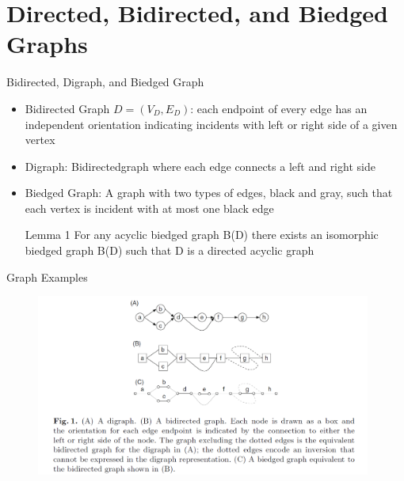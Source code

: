 \documentclass{beamer}
\begin{document}
\section{Directed, Bidirected, and Biedged Graphs}
\begin{frame}{Bidirected, Digraph, and Biedged Graph}
\begin{itemize}
    \item  Bidirected Graph $D= (V_D,E_D)$: each endpoint of every edge has an independent orientation indicating incidents with left or right side of a given vertex
    \item Digraph: Bidirectedgraph where each edge connects a left and right side
    \item Biedged Graph: A graph with two types of edges, black and gray, such that each vertex is incident with at most one black edge
    \begin{block}{Lemma 1}
    For any acyclic biedged graph B(D) there exists an isomorphic biedged graph B(D) such that D is a directed acyclic graph
    \end{block}
\end{itemize}
\end{frame}
\begin{frame}{Graph Examples}
\begin{figure}[H]
\centering
\includegraphics[width=110mm]{DiBidiBiedge.png}
\end{figure}
\end{frame}
\end{document}
